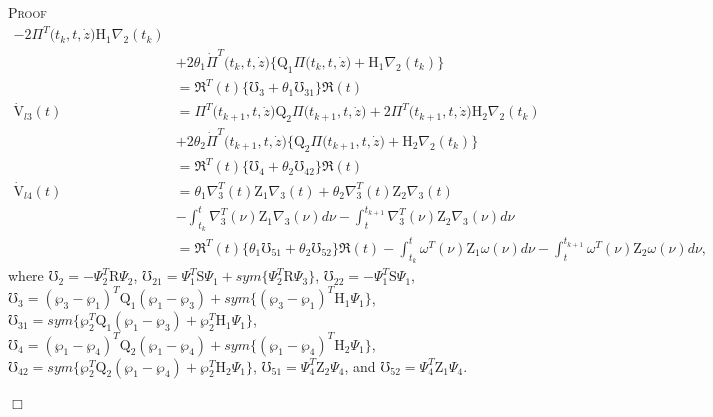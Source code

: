 \documentclass[preprint,11pt]{elsarticle}
\newenvironment{proof}{\noindent \textsc{Proof}\ }{\mbox{}\hfill $\Box$\\}
\begin{document}
\begin{proof}
\begin{align}
-2\Pi^T\big(t_k,t,\dot{z}\big)\mathrm{H}_1 \nabla_2(t_k)\nonumber\\
&+2\theta_1\dot{\Pi}^T\big(t_k,t,\dot{z}\big)\big\{\mathrm{Q}_1\Pi\big(t_k,t,\dot{z}\big)
+\mathrm{H}_1 \nabla_2(t_k)\big\}\nonumber\\
&=\Re^T(t) \big\{\mho_3+\theta_1\mho_{31}\big\}\Re(t)\label{34}\\
\mathrm{\dot{V}}_{l3}(t)&=\Pi^T\big(t_{k+1},t,\dot{z}\big)\mathrm{Q}_2\Pi\big(t_{k+1},t,\dot{z}\big)
+2\Pi^T\big(t_{k+1},t,\dot{z}\big)\mathrm{H}_2 \nabla_2(t_k)\nonumber\\
&+2\theta_2\dot{\Pi}^T\big(t_{k+1},t,\dot{z}\big)\big\{ \mathrm{Q}_2\Pi\big(t_{k+1},t,\dot{z}\big)+\mathrm{H}_2 \nabla_2(t_k)\big\}\nonumber\\
&=\Re^T(t) \big\{\mho_4+\theta_2\mho_{42}\big\}\Re(t)\label{35}\\
\mathrm{\dot{V}}_{l4}(t)&=\theta_1\nabla^T_3(t)\mathrm{Z}_1\nabla_3(t)+\theta_2\nabla^T_3(t)\mathrm{Z}_2\nabla_3(t)\nonumber\\
&
-\int^t_{t_k}\nabla^T_3(\nu)\mathrm{Z}_1\nabla_3(\nu)d\nu
-\int^{t_{k+1}}_{t}\nabla^T_3(\nu)\mathrm{Z}_2\nabla_3(\nu)d\nu\nonumber\\
&=\Re^T(t) \big\{\theta_1\mho_{51}+\theta_2\mho_{52}\big\}\Re(t)-\int^t_{t_k}\omega^T(\nu)\mathrm{Z}_1\omega(\nu)d\nu
-\int^{t_{k+1}}_{t}\omega^T(\nu)\mathrm{Z}_2\omega(\nu)d\nu,\label{36}
\end{align}
where $\mho_2=-\Psi_2^T\mathrm{R}\Psi_2$, $\mho_{21}=\Psi_1^T\mathrm{S}\Psi_1+sym\{\Psi_2^T\mathrm{R}\Psi_3\}$, $\mho_{22}=-\Psi_1^T\mathrm{S}\Psi_1$,
$\mho_3=(\wp_3-\wp_1)^T\mathrm{Q}_1(\wp_1-\wp_3)+sym\{(\wp_3-\wp_1)^T\mathrm{H}_1\Psi_1\}$,
$\mho_{31}=sym\{\wp_2^T\mathrm{Q}_1(\wp_1-\wp_3)+\wp_2^T\mathrm{H}_1\Psi_1\}$,
$\mho_4=(\wp_1-\wp_4)^T\mathrm{Q}_2(\wp_1-\wp_4)+sym\{(\wp_1-\wp_4)^T\mathrm{H}_2\Psi_1\}$,
$\mho_{42}=sym\{\wp_2^T\mathrm{Q}_2(\wp_1-\wp_4)+\wp_2^T\mathrm{H}_2\Psi_1\}$,
$\mho_{51}=\Psi_4^T\mathrm{Z}_2\Psi_4$, and $\mho_{52}=\Psi_4^T\mathrm{Z}_1\Psi_4$.


\end{proof}
\end{document}
